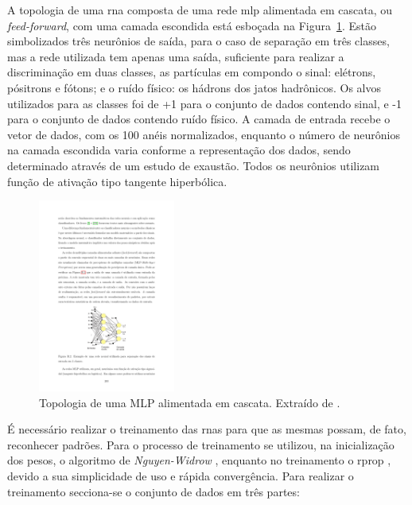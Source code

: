 
A topologia de uma \gls{rna} composta de uma rede \gls{mlp} alimentada em
cascata, ou \emph{feed-forward}, com uma camada escondida está esboçada na
Figura~\ref{fig:topologia_rna}. Estão simbolizados três neurônios de saída, para
o caso de separação em três classes, mas a rede utilizada tem apenas uma saída,
suficiente para realizar a discriminação em duas classes, as partículas \gls{em}
compondo o sinal: elétrons, pósitrons e fótons; e o ruído físico: os
hádrons dos jatos hadrônicos. Os alvos utilizados para as classes foi de +1 para o
conjunto de dados contendo sinal, e -1 para o conjunto de dados contendo ruído físico.
A camada de entrada recebe o vetor de dados, com os 100 anéis normalizados, enquanto o número de 
neurônios na camada escondida varia conforme a representação dos dados, 
sendo determinado através de um estudo de exaustão. Todos os neurônios utilizam
função de ativação tipo tangente hiperbólica.

\begin{figure}[ht!]
\label{fig:topologia_rna}
\centering
\includegraphics[width=0.4\textwidth]{imagens/topologia_rna.pdf}
\caption[Topologia de uma MLP alimentada em cascata.]{Topologia de uma
MLP alimentada em cascata. Extraído de \cite{tese_eduardo}.}
\end{figure}

É necessário realizar o treinamento das \glspl{rna} para que as mesmas possam, de
fato, reconhecer padrões. Para o processo de treinamento se
utilizou, na inicialização dos pesos, o algoritmo de \emph{Nguyen-Widrow} \cite{initnw}, 
enquanto no treinamento o \gls{rprop} \cite{rprop}, devido a sua simplicidade de uso e 
rápida convergência. Para realizar o treinamento secciona-se o conjunto de dados
em três partes: 

